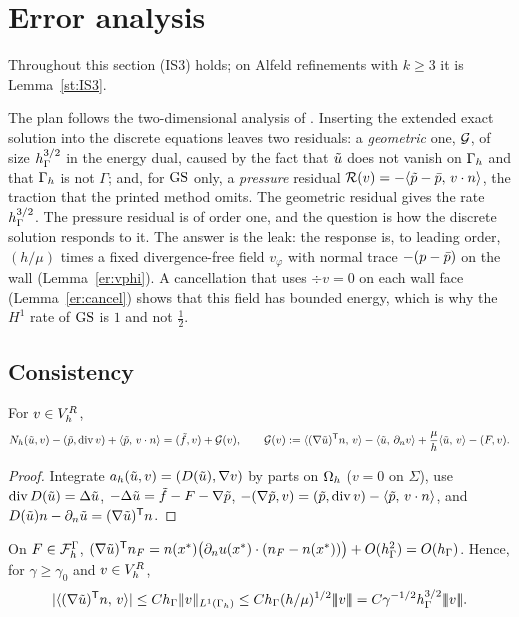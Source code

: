 \section{Error analysis}\label{sec:error}

Throughout this section (IS3) holds; on Alfeld refinements with $k\ge3$ it is Lemma~\ref{st:IS3}.

The plan follows the two-dimensional analysis of \cite{PadhiLong2D}. Inserting the extended exact solution into the discrete equations leaves two residuals: a \emph{geometric} one, $\mathcal G$, of size $h_\Gamma^{3/2}$ in the energy dual, caused by the fact that $\tilde u$ does not vanish on $\Gamma_h$ and that $\Gamma_h$ is not $\Gamma$; and, for $\mathrm{GS}$ only, a \emph{pressure} residual $\mathcal R(v)=-\langle \tilde p-\bar p,\, v\cdot n\rangle$, the traction that the printed method omits. The geometric residual gives the rate $h_\Gamma^{3/2}$. The pressure residual is of order one, and the question is how the discrete solution responds to it. The answer is the leak: the response is, to leading order, $(h/\mu)$ times a fixed divergence-free field $v_\varphi$ with normal trace $-(p-\bar p)$ on the wall (Lemma~\ref{er:vphi}). A cancellation that uses $\div v=0$ on each wall face (Lemma~\ref{er:cancel}) shows that this field has bounded energy, which is why the $H^1$ rate of $\mathrm{GS}$ is $1$ and not $\frac12$.

\subsection{Consistency}

\begin{lemma}\label{er:eq}
For $v\in V_h^R$,
\[
N_h(\tilde u,v)-(\tilde p,\operatorname{div} v)+\langle \tilde p,\, v\cdot n\rangle=(\tilde f,v)+\mathcal G(v),\qquad
\mathcal G(v):=\langle (\nabla\tilde u)^{\mathsf T}n,\, v\rangle-\langle \tilde u,\, \partial_n v\rangle+\frac\mu h\langle \tilde u,\, v\rangle-(F,v).
\]
\end{lemma}

\begin{proof}
Integrate $a_h(\tilde u,v)=(D(\tilde u),\nabla v)$ by parts on $\Omega_h$ ($v=0$ on $\Sigma$), use $\operatorname{div} D(\tilde u)=\Delta\tilde u$, $-\Delta\tilde u=\tilde f-F-\nabla\tilde p$, $-(\nabla\tilde p,v)=(\tilde p,\operatorname{div} v)-\langle \tilde p,\, v\cdot n\rangle$, and $D(\tilde u)n-\partial_n\tilde u=(\nabla\tilde u)^{\mathsf T}n$.
\end{proof}

\begin{proposition}\label{er:transposed}
On $F\in\mathcal F_h^\Gamma$, $(\nabla\tilde u)^{\mathsf T}n_F=n(x^\ast)\bigl(\partial_n u(x^\ast)\cdot(n_F-n(x^\ast))\bigr)+O(h_\Gamma^2)=O(h_\Gamma)$. Hence, for $\gamma\ge\gamma_0$ and $v\in V_h^R$,
\[
|\ip{(\nabla\ut)^{\mathsf T}n}{v}|\le C\hG\norm v_{L^1(\Gh)}\le C\hG(h/\mu)^{1/2}\tnorm v=C\gamma^{-1/2}\hG^{3/2}\tnorm v .
\]
\end{proposition}

